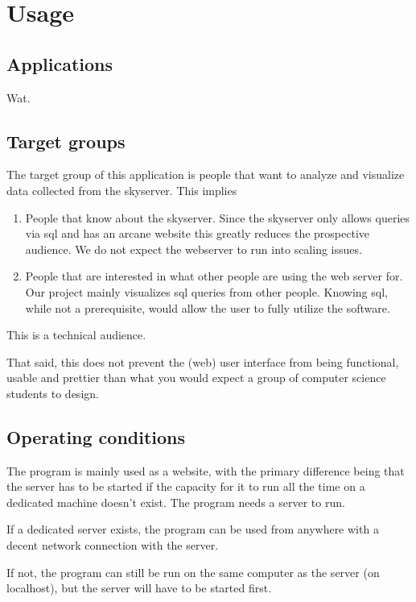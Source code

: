\section{Usage}

\subsection{Applications}
Wat.

\subsection{Target groups}

The target group of this application is people that want to analyze 
and visualize data collected from the skyserver. This implies

\begin{enumerate}
   \item People that know about the skyserver. Since the skyserver only 
   allows queries via sql and has an arcane website this greatly 
   reduces the prospective audience. We do not expect the webserver 
   to run into scaling issues.
  
  \item People that are interested in what other people are 
  using the web server for. Our project mainly visualizes sql queries
   from other people. Knowing sql, while not a prerequisite, 
   would allow the user to fully utilize the software.
  
\end{enumerate}

This is a technical audience.

That said, this does not prevent the (web) user interface from being functional,
 usable and prettier than what you would expect a group of 
 computer science students to design.
 

\subsection{Operating conditions}

The program is mainly used as a website, with the primary difference being
 that the server has to be started if the capacity for it to run 
 all the time on a dedicated machine doesn't exist. 
The program needs a server to run. 

If a dedicated server exists, the program can be used from anywhere
 with a decent network connection with the server.

If not, the program can still be run on the same computer as 
the server (on localhost), but the server will have to be started first.
 

